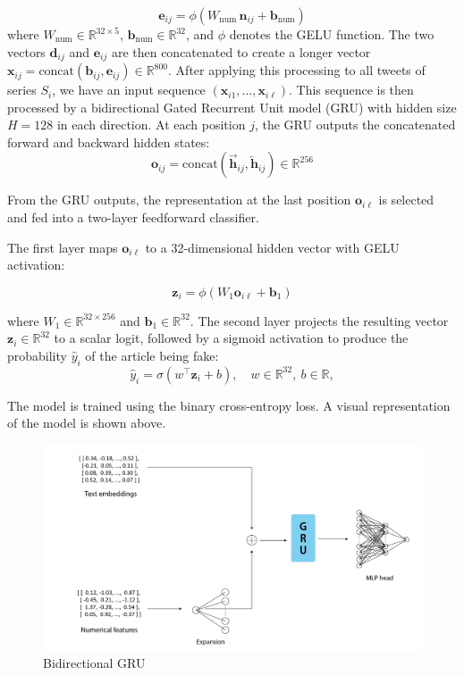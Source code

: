 \documentclass[a4paper,twoside,12pt]{book}
\begin{document}
\[
\mathbf{e}_{ij} =  \phi\!\left(W_{\text{num}}\,\mathbf{n}_{ij} + \mathbf{b}_{\text{num}}\right)
\]
where $W_{\text{num}} \in \mathbb{R}^{32 \times 5}$, $\mathbf{b}_{\text{num}} \in \mathbb{R}^{32}$, and $\phi$ denotes the GELU function. The two vectors $\mathbf{d}_{ij}$ and $\mathbf{e}_{ij}$ are then concatenated to create a longer vector $\mathbf{x}_{ij} = \text{concat}(\mathbf{b}_{ij}, \mathbf{e}_{ij}) \in \mathbb{R}^{800}$. After applying this processing to all tweets of series $S_i$, we have an input sequence $(\mathbf{x}_{i1}, \dots, \mathbf{x}_{i\ell})$. This sequence is then processed by a bidirectional Gated Recurrent Unit model (GRU) with hidden size $H=128$ in each direction. At each position $j$, the GRU outputs the concatenated forward and backward hidden states:
\[
\mathbf{o}_{ij} = \text{concat}(\overrightarrow{\mathbf{h}}_{ij}, \overleftarrow{\mathbf{h}}_{ij}) \in \mathbb{R}^{256}
\]

From the GRU outputs, the representation at the last position $\mathbf{o}_{i\ell}$ is selected and fed into a two-layer feedforward classifier. 

The first layer maps $\mathbf{o}_{i\ell}$ to a 32-dimensional hidden vector with GELU activation:

\[
\mathbf{z}_i = \phi(W_1 \mathbf{o}_{i\ell} + \mathbf{b}_1)
\]

where $W_1 \in \mathbb{R}^{32 \times 256}$ and $\mathbf{b}_1 \in \mathbb{R}^{32}$. The second layer projects the resulting vector $\mathbf{z}_i \in \mathbb{R}^{32} $ to a scalar logit, followed by a sigmoid activation to produce the probability $\hat{y}_i$ of the article being fake:
\[
\hat{y}_i = \sigma(w^\top \mathbf{z}_i + b), \quad w \in \mathbb{R}^{32}, \ b \in \mathbb{R},
\]

The model is trained using the binary cross-entropy loss. A visual representation of the model is shown above. 

\begin{figure}
	\centering
	\includegraphics[width=1.1\textwidth]{./img/1_seq_model.png}
	\caption{Bidirectional GRU} \label{GRU}
\end{figure}
\end{document}
